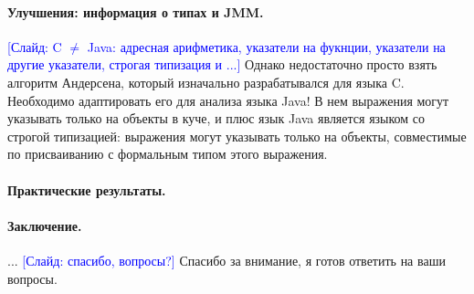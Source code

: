 \documentclass[12pt]{article}
\newcommand{\slide}[1]{\textcolor{Blue}{[Слайд: #1]}}
\begin{document}
  \paragraph{Улучшения: информация о типах и JMM.}
  \slide{C $\neq$ Java: адресная арифметика, указатели на фукнции, указатели на
  другие указатели, строгая типизация и ...}
  Однако недостаточно просто взять алгоритм Андерсена, который изначально
  разрабатывался для языка C. Необходимо адаптировать его для анализа языка
  Java! В нем выражения могут указывать только на объекты в куче, и плюс язык
  Java является языком со строгой типизацией: выражения могут указывать только
  на объекты, совместимые по присваиванию с формальным типом этого выражения.

  \paragraph{Практические результаты.}

  \paragraph{Заключение.}
  ...
  \slide{спасибо, вопросы?}
  Спасибо за внимание, я готов ответить на ваши вопросы.
\end{document}
